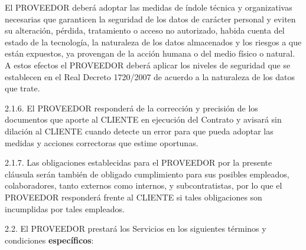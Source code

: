 \documentclass['12pt',spanish,a4paper,]{article}
\begin{document}
El PROVEEDOR deberá adoptar las medidas de índole técnica y
organizativas necesarias que garanticen la seguridad de los datos de
carácter personal y eviten su alteración, pérdida, tratamiento o acceso
no autorizado, habida cuenta del estado de la tecnología, la naturaleza
de los datos almacenados y los riesgos a que están expuestos, ya
provengan de la acción humana o del medio físico o natural. A estos
efectos el PROVEEDOR deberá aplicar los niveles de seguridad que se
establecen en el Real Decreto 1720/2007 de acuerdo a la naturaleza de
los datos que trate.

2.1.6. El PROVEEDOR responderá de la corrección y precisión de los
documentos que aporte al CLIENTE en ejecución del Contrato y avisará sin
dilación al CLIENTE cuando detecte un error para que pueda adoptar las
medidas y acciones correctoras que estime oportunas.

2.1.7. Las obligaciones establecidas para el PROVEEDOR por la presente
cláusula serán también de obligado cumplimiento para sus posibles
empleados, colaboradores, tanto externos como internos, y
subcontratistas, por lo que el PROVEEDOR responderá frente al CLIENTE si
tales obligaciones son incumplidas por tales empleados.

2.2. El PROVEEDOR prestará los Servicios en los siguientes términos y
condiciones \textbf{específicos}:
\end{document}

